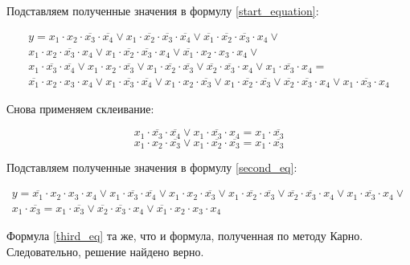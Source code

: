 \documentclass[a4paper, 12pt]{article}
\begin{document}
Подставляем полученные значения в формулу \ref{start_equation}:

\begin{eqnarray}\label{second_eq}
  y = x_1 \cdot x_2 \cdot \overline{x_3} \cdot \overline{x_4} \vee x_1 \cdot \overline{x_2} \cdot \overline{x_3} \cdot \overline{x_4} \vee \overline{x_1} \cdot \overline{x_2} \cdot  \overline{x_3} \cdot x_4 \vee \nonumber \nonumber \\
  x_1 \cdot x_2 \cdot \overline{x_3} \cdot x_4 \vee x_1 \cdot \overline{x_2} \cdot \overline{x_3} \cdot x_4 \vee \overline{x_1} \cdot x_2 \cdot x_3 \cdot x_4 \vee \nonumber \\
  x_1 \cdot \overline{x_3} \cdot \overline{x_4} \vee x_1 \cdot x_2 \cdot \overline{x_3} \vee x_1 \cdot \overline{x_2} \cdot \overline{x_3} \vee \overline{x_2} \cdot \overline{x_3} \cdot x_4 \vee x_1 \cdot \overline{x_3} \cdot x_4 = \nonumber \\
  \overline{x_1} \cdot x_2 \cdot x_3 \cdot x_4 \vee x_1 \cdot \overline{x_3} \cdot \overline{x_4} \vee x_1 \cdot x_2 \cdot \overline{x_3} \vee x_1 \cdot \overline{x_2} \cdot \overline{x_3} \vee \overline{x_2} \cdot \overline{x_3} \cdot x_4 \vee x_1 \cdot \overline{x_3} \cdot x_4 
\end{eqnarray}

Снова применяем склеивание:

$$x_1 \cdot \overline{x_3} \cdot \overline{x_4} \vee x_1 \cdot \overline{x_3} \cdot x_4 = x_1 \cdot \overline{x_3}$$
$$x_1 \cdot x_2 \cdot \overline{x_3} \vee x_1 \cdot \overline{x_2} \cdot \overline{x_3} = x_1 \cdot \overline{x_3}$$

Подставляем полученные значения в формулу \ref{second_eq}:

\begin{eqnarray}\label{third_eq}
  y = \overline{x_1} \cdot x_2 \cdot x_3 \cdot x_4 \vee x_1 \cdot \overline{x_3} \cdot \overline{x_4} \vee x_1 \cdot x_2 \cdot \overline{x_3} \vee x_1 \cdot \overline{x_2} \cdot \overline{x_3} \vee \overline{x_2} \cdot \overline{x_3} \cdot x_4 \vee x_1 \cdot \overline{x_3} \cdot x_4 \vee \nonumber \\
  x_1 \cdot \overline{x_3} = x_1 \cdot \overline{x_3} \vee \overline{x_2} \cdot \overline{x_3} \cdot x_4 \vee \overline{x_1} \cdot x_2 \cdot x_3 \cdot x_4
\end{eqnarray}

Формула \ref{third_eq} та же, что и формула, полученная по методу Карно. Следовательно, решение найдено верно.
\end{document}
